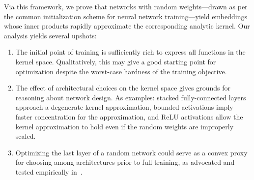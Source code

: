 Via this framework, we prove that networks with random weights---drawn
as per the common initialization scheme for neural network
training---yield embeddings whose inner products rapidly approximate
the corresponding analytic kernel.
%
Our analysis yields several upshots:
\begin{enumerate}
\item The initial point of training is sufficiently
  rich to express all functions in the kernel space. Qualitatively,
  this may give a good starting point for optimization despite the
  worst-case hardness of the training objective.
\item The effect of architectural choices on the kernel space gives
  grounds for reasoning about network design. As examples: stacked
  fully-connected layers approach a degenerate kernel approximation,
  bounded activations imply faster concentration for the approximation,
  and ReLU activations allow the kernel approximation to hold even if the random
  weights are improperly scaled.
\item Optimizing the last layer of a random network could serve as a
  convex proxy for choosing among architectures prior to full training,
  as advocated and tested empirically in~\citet{saxe2011random}.
\end{enumerate}
\fi
